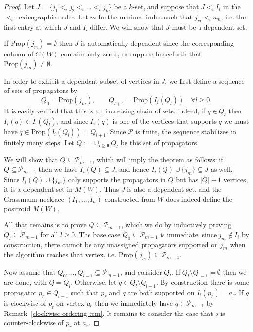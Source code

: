 \documentclass[11pt]{article}
\newcommand{\cP}{\mathcal{P}}
\newcommand{\Prop}{\textrm{Prop}}
\theoremstyle{remark}
\theoremstyle{definition}
\begin{document}
\begin{proof}
Let $J = \{j_1 <_i j_2<_i \dots <_i j_k\}$ be a $k$-set, and suppose that $J<_i I_i$ in the $<_i$-lexicographic order. Let $m$ be the minimal index such that $j_m <_i a_m$, i.e. the first entry at which $J$ and $I_i$ differ. We will show that $J$ must be a dependent set.

If $\Prop(j_m) = \emptyset$ then $J$ is automatically dependent since the corresponding column of $C(W)$ contains only zeros, so suppose henceforth that $\Prop(j_m) \neq \emptyset$. %

In order to exhibit a dependent subset of vertices in $J$, we first define a sequence of sets of propagators by
\[Q_0 = \Prop(j_m), \qquad Q_{l+1} = \Prop(I_i(Q_l))\quad \forall l \geq 0.\]
It is easily verified that this is an increasing chain of sets: indeed, if $q \in Q_l$ then $I_i(q) \in I_i(Q_l)$, and since $I_i(q)$ is one of the vertices that supports $q$ we must have $q \in \Prop(I_i(Q_l)) = Q_{l+1}$. Since $\cP$ is finite, the sequence stabilizes in finitely many steps. Let $Q := \cup_{l \geq 0} Q_l$ be this set of propagators.

We will show that $Q \subseteq \mathcal{P}_{m-1}$, which will imply the theorem as follows: if $Q \subseteq \cP_{m-1}$ then we have $I_i(Q)\subseteq J$, and hence $I_i(Q) \cup \{j_m\} \subseteq J$ as well. Since $I_i(Q) \cup \{j_m\}$ only supports the propagators in $Q$ but has $|Q|+1$ vertices, it is a dependent set in $M(W)$. Thus $J$ is also a dependent set, and the Grassmann necklace $(I_1,\dots,I_n)$ constructed from $W$ does indeed define the positroid $M(W)$.

All that remains is to prove $Q\subseteq \mathcal{P}_{m-1}$, which we do by inductively proving $Q_l \subseteq \mathcal{P}_{m-1}$ for all $l \geq 0$. The base case $Q_0 \subseteq \cP_{m-1}$ is immediate: since $j_m \not\in I_i$ by construction, there cannot be any unassigned propagators supported on $j_m$ when the algorithm reaches that vertex, i.e. $\Prop(j_m) \subseteq \cP_{m-1}$.

Now assume that $Q_0,\dots,Q_{l-1} \subseteq \cP_{m-1}$, and consider $Q_{l}$. If $Q_{l} \setminus Q_{l-1} = \emptyset$ then we are done, with $Q = Q_l$.  Otherwise, let $q \in Q_{l} \setminus Q_{l-1}$. By construction there is some propagator $p_r \in Q_{l-1}$ such that $p_r$ and $q$ are both supported on $I_i(p_r) = a_r$. If $q$ is clockwise of $p_r$ on vertex $a_r$ then we immediately have $q \in \cP_{m-1}$ by Remark~\ref{clockwise ordering rem}.  It remains to consider the case that $q$ is counter-clockwise of $p_r$ at $a_r$.


\end{proof}
\end{document}
